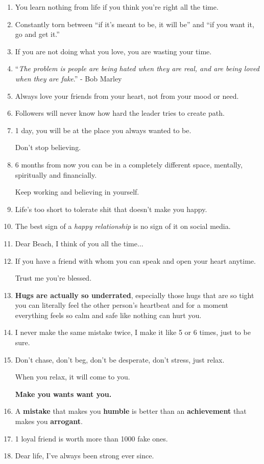 \documentclass{article}
\numberwithin{equation}{section}
\begin{document}
\begin{enumerate}
    So just be patient.
    \item You learn nothing from life if you think you're right all the time.
    \item Constantly torn between ``if it's meant to be, it will be'' and ``if you want it, go and get it.''
    \item If you are not doing what you love, you are wasting your time.
    \item ``\textit{The problem is people are being hated when they are real, and are being loved when they are fake}.'' - Bob Marley
    \item Always love your friends from your heart, not from your mood or need.
    \item Followers will never know how hard the leader tries to create path.
    \item 1 day, you will be at the place you always wanted to be.
    
    Don't stop believing.
    \item 6 months from now you can be in a completely different space, mentally, spiritually and financially.
    
    Keep working and believing in yourself.
    \item Life's too short to tolerate shit that doesn't make you happy.
    \item The best sign of a \textit{happy relationship} is no sign of it on social media.
    \item Dear Beach, I think of you all the time$\ldots$
    \item If you have a friend with whom you can speak and open your heart anytime.
    
    Trust me you're blessed.
    \item \textbf{Hugs are actually so underrated}, especially those hugs that are so tight you can literally feel the other person's heartbeat and for a moment everything feels so calm and safe like nothing can hurt you.
    \item I never make the same mistake twice, I make it like 5 or 6 times, just to be sure.
    \item Don't chase, don't beg, don't be desperate, don't stress, just relax.
    
    When you relax, it will come to you.
    
    \textbf{Make you wants want you.}
    \item A \textbf{mistake} that makes you \textbf{humble} is better than an \textbf{achievement} that makes you \textbf{arrogant}.
    \item 1 loyal friend is worth more than 1000 fake ones.
    \item Dear life, I've always been strong ever since.
    

\end{enumerate}
\end{document}
